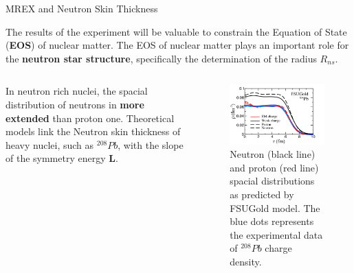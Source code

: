 \documentclass[9pt,a4paper]{beamer}
\newcommand{\commento}[1]{}
\begin{document}
\begin{frame}{MREX and Neutron Skin Thickness}

The results of the experiment will be valuable to constrain the Equation of State (\textbf{EOS}) of nuclear matter. The EOS of nuclear matter plays an important role for the \textbf{neutron star structure}, specifically the determination of the radius $R_{ns}$. \smallskip

\begin{columns}[T]
\begin{column}{.5\textwidth}
\commento{The neutron skin thickness is determined by the competition of two terms of the nuclear binding energy: the surface term and the symmetry energy.}
In neutron rich nuclei, the spacial distribution of neutrons in \textbf{more extended} than proton one.
Theoretical models link the Neutron skin thickness of heavy nuclei, such as $^{208}Pb$, with the slope of the symmetry energy \textbf{L}.

\end{column}
\begin{column}{.5\textwidth}
\begin{figure}
\centering
\includegraphics[width = 1\textwidth]{figures/SpacialDistribution.png}
\caption{Neutron (black line) and proton (red line) spacial distributions as predicted by FSUGold model. The blue dots represents the experimental data of $^{208}Pb$ charge density.}
\end{figure}
\end{column}
\end{columns}
\end{frame}
\end{document}

